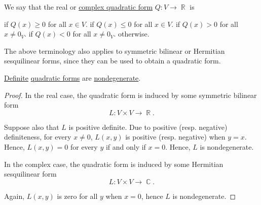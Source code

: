 \begin{definition}\label{def:quadratic_form_definiteness}\mimprovised
  We say that the real or \hyperref[rem:complex_quadratic_form]{complex quadratic form} \( Q: V \to \BbbR \) is
  \begin{thmenum}
      if \( Q(x) \geq 0 \) for all \( x \in V \).
      if \( Q(x) \leq 0 \) for all \( x \in V \).
      if \( Q(x) > 0 \) for all \( x \neq 0_V \).
      if \( Q(x) < 0 \) for all \( x \neq 0_V \).
      otherwise.
  \end{thmenum}

  The above terminology also applies to symmetric bilinear or Hermitian sesquilinear forms, since they can be used to obtain a quadratic form.
\end{definition}

\begin{proposition}\label{thm:quadratic_forms_are_nondegenerate}
  \hyperref[def:quadratic_form_definiteness]{Definite} \hyperref[thm:quadratic_forms]{quadratic forms} are \hyperref[def:degenerate_bilinear_form]{nondegenerate}.
\end{proposition}
\begin{proof}
  In the real case, the quadratic form is induced by some symmetric bilinear form
  \begin{equation*}
    L: V \times V \to \BbbR.
  \end{equation*}

  Suppose also that \( L \) is positive definite. Due to positive (resp. negative) definiteness, for every \( x \neq 0 \), \( L(x, y) \) is positive (resp. negative) when \( y = x \). Hence, \( L(x, y) = 0 \) for every \( y \) if and only if \( x = 0 \). Hence, \( L \) is nondegenerate.

  In the complex case, the quadratic form is induced by some Hermitian sesquilinear form
  \begin{equation*}
    L: V \times V \to \BbbC.
  \end{equation*}

  Again, \( L(x, y) \) is zero for all \( y \) when \( x = 0 \), hence \( L \) is nondegenerate.
\end{proof}

